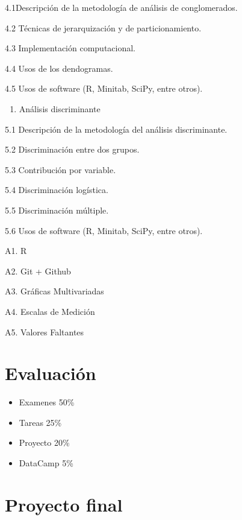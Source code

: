 \documentclass[
]{book}
\providecommand{\tightlist}{%
  \setlength{\itemsep}{0pt}\setlength{\parskip}{0pt}}
\begin{document}
4.1Descripción de la metodología de análisis de conglomerados.

4.2 Técnicas de jerarquización y de particionamiento.

4.3 Implementación computacional.

4.4 Usos de los dendogramas.

4.5 Usos de software (R, Minitab, SciPy, entre otros).

\begin{enumerate}
\def\labelenumi{\arabic{enumi}.}
\setcounter{enumi}{4}
\tightlist
\item
  Análisis discriminante
\end{enumerate}

5.1 Descripción de la metodología del análisis discriminante.

5.2 Discriminación entre dos grupos.

5.3 Contribución por variable.

5.4 Discriminación logística.

5.5 Discriminación múltiple.

5.6 Usos de software (R, Minitab, SciPy, entre otros).

A1. R

A2. Git + Github

A3. Gráficas Multivariadas

A4. Escalas de Medición

A5. Valores Faltantes

\section{Evaluación}\label{evaluaciuxf3n}

\begin{itemize}
\tightlist
\item
  Examenes 50\%
\item
  Tareas 25\%
\item
  Proyecto 20\%
\item
  DataCamp 5\%
\end{itemize}

\section{Proyecto final}\label{proyecto-final}
\end{document}
